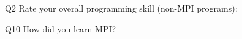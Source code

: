 \begin{description}%
\item{Q2} Rate your overall programming skill (non-MPI programs):%
\item{Q10} How did you learn MPI?%
\end{description}%
